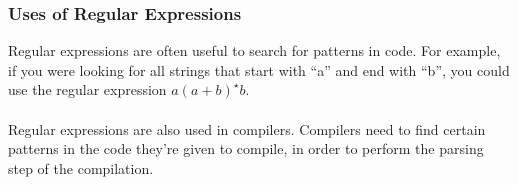 \documentclass[]{article}
\theoremstyle{definition}
\begin{document}
        \subsubsection{Uses of Regular Expressions}
          Regular expressions are often useful to search for patterns in code. For example, if you were looking for all strings that start with ``a'' and end with ``b'', you could use the regular expression $a(a + b)^\star b$.
          \\ \\
          Regular expressions are also used in compilers. Compilers need to find certain patterns in the code they're given to compile, in order to perform the parsing step of the compilation.
\end{document}
